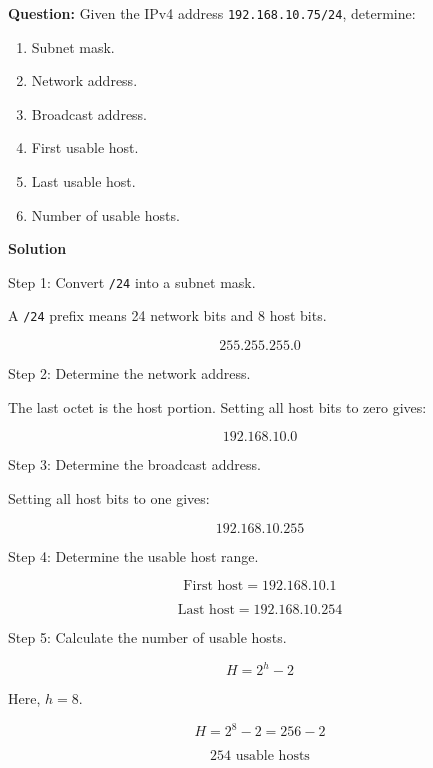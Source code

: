 \textbf{Question:} Given the IPv4 address \texttt{192.168.10.75/24}, determine:

\begin{enumerate}
\item Subnet mask.
\item Network address.
\item Broadcast address.
\item First usable host.
\item Last usable host.
\item Number of usable hosts.
\end{enumerate}

\textbf{Solution}

Step 1: Convert \texttt{/24} into a subnet mask.

A \texttt{/24} prefix means 24 network bits and 8 host bits.



\[
\boxed{255.255.255.0}
\]



Step 2: Determine the network address.

The last octet is the host portion. Setting all host bits to zero gives:



\[
\boxed{192.168.10.0}
\]



Step 3: Determine the broadcast address.

Setting all host bits to one gives:



\[
\boxed{192.168.10.255}
\]



Step 4: Determine the usable host range.



\[
\text{First host}=192.168.10.1
\]





\[
\text{Last host}=192.168.10.254
\]



Step 5: Calculate the number of usable hosts.



\[
H=2^h-2
\]



Here, $h=8$.



\[
H=2^8-2=256-2
\]





\[
\boxed{254\text{ usable hosts}}
\]



